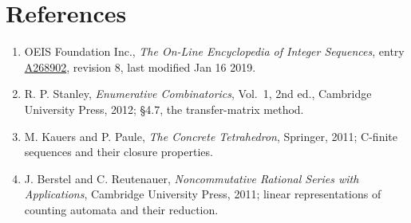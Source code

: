 \documentclass[11pt]{article}
\theoremstyle{definition}
\begin{document}
\section{References}

\begin{enumerate}

\item OEIS Foundation Inc., \emph{The On-Line Encyclopedia of Integer Sequences}, entry \href{https://oeis.org/A268902}{A268902}, revision 8, last modified Jan 16 2019.

\item R. P. Stanley, \emph{Enumerative Combinatorics}, Vol.~1, 2nd ed., Cambridge University Press, 2012; \S4.7, the transfer-matrix method.

\item M. Kauers and P. Paule, \emph{The Concrete Tetrahedron}, Springer, 2011; C-finite sequences and their closure properties.

\item J. Berstel and C. Reutenauer, \emph{Noncommutative Rational Series with Applications}, Cambridge University Press, 2011; linear representations of counting automata and their reduction.

\end{enumerate}
\end{document}
